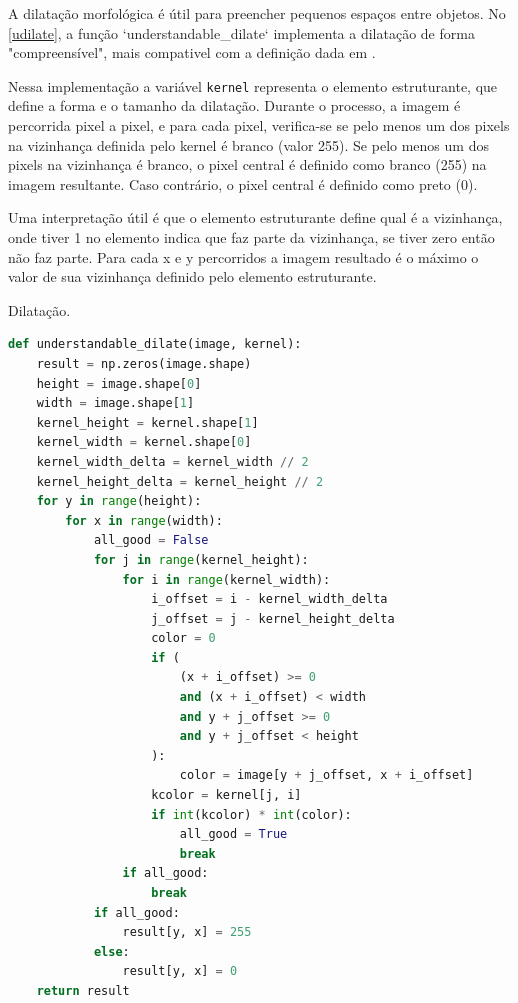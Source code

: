 \documentclass[english, 
               brazil, 
               bsc] %
               {dcomp-abntex2}
\begin{document}
 A dilatação morfológica é útil para preencher pequenos espaços entre objetos. No \autoref{udilate}, a função `understandable\_dilate` implementa a dilatação de forma "compreensível", mais compativel com a definição dada em .


 Nessa implementação a variável \texttt{kernel} representa o elemento estruturante, que define a forma e o tamanho da dilatação. Durante o processo, a imagem é percorrida pixel a pixel, e para cada pixel, verifica-se se pelo menos um dos pixels na vizinhança definida pelo kernel é branco (valor 255). Se pelo menos um dos pixels na vizinhança é branco, o pixel central é definido como branco (255) na imagem resultante. Caso contrário, o pixel central é definido como preto (0).


 Uma interpretação útil é que o elemento estruturante define qual é a vizinhança, onde tiver 1 no elemento indica que faz parte da vizinhança, se tiver zero então não faz parte. Para cada x e y percorridos a imagem resultado é o máximo o valor de sua vizinhança definido pelo elemento estruturante.


\begin{codigo}[h]
  \caption{\small Dilatação.}
 \label{udilate}
\begin{lstlisting}[language=python]
def understandable_dilate(image, kernel):
    result = np.zeros(image.shape)
    height = image.shape[0]
    width = image.shape[1]
    kernel_height = kernel.shape[1]
    kernel_width = kernel.shape[0]
    kernel_width_delta = kernel_width // 2
    kernel_height_delta = kernel_height // 2
    for y in range(height):
        for x in range(width):
            all_good = False
            for j in range(kernel_height):
                for i in range(kernel_width):
                    i_offset = i - kernel_width_delta
                    j_offset = j - kernel_height_delta
                    color = 0
                    if (
                        (x + i_offset) >= 0
                        and (x + i_offset) < width
                        and y + j_offset >= 0
                        and y + j_offset < height
                    ):
                        color = image[y + j_offset, x + i_offset]
                    kcolor = kernel[j, i]
                    if int(kcolor) * int(color):
                        all_good = True
                        break
                if all_good:
                    break
            if all_good:
                result[y, x] = 255
            else:
                result[y, x] = 0
    return result
\end{lstlisting}
\end{codigo}
\end{document}
